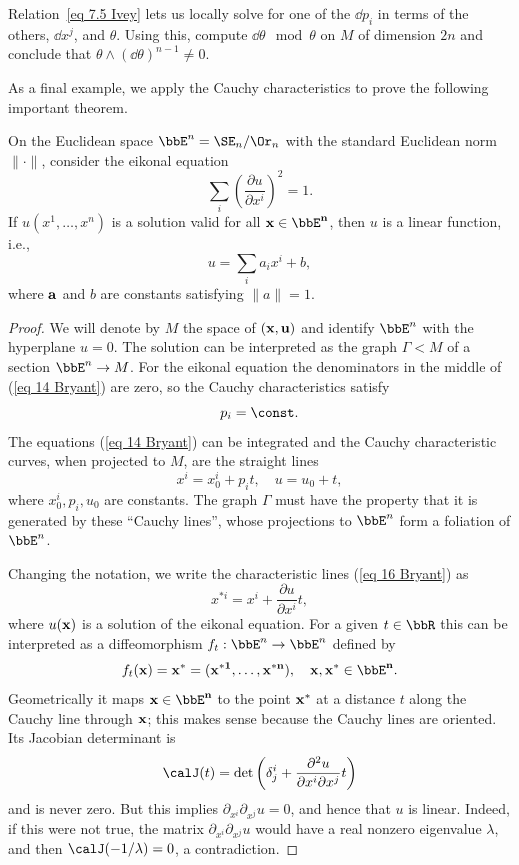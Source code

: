 \begin{xca}
    Relation~\ref{eq 7.5 Ivey} lets us locally solve for one of the $\dd p_i$ in terms of the others, $\dd x^j$, and $\theta$. Using this, compute $\dd\theta\mod \theta$ on $M$ of dimension $2n$ and conclude that $\theta\wedge(\dd\theta)^{n-1}\neq 0$.
\end{xca}


As a final example, we apply the Cauchy characteristics to prove the following important theorem.

\begin{thm}
    On the Euclidean space $\bbE^n=\SE_n\slash \Or_n$ with the standard Euclidean norm $\lVert\cdot\rVert$, consider the eikonal equation 
    \[\sum_i \left(\frac{\partial u}{\partial x^i}\right)^2=1.\]
    If $u(x^1,\ldots,x^n)$ is a solution valid for all $\bf{x}\in \bbE^n$, then $u$ is a linear function, i.e.,
    \[u=\sum_i a_i x^i+b,\]
    where $\bf{a}$ and $b$ are constants satisfying $\lVert a\rVert=1$.
\end{thm}
\begin{proof}
    We will denote by $M$ the space of $(\bf{x},u)$ and identify $\bbE^n$ with the hyperplane $u=0$. The solution can be interpreted as the graph $\Gamma < M$ of a section $\bbE^n\to M$. For the eikonal equation the denominators in the middle of (\ref{eq 14 Bryant}) are zero, so the Cauchy characteristics satisfy 
    \[p_i=\const.\]
    The equations (\ref{eq 14 Bryant}) can be integrated and the Cauchy characteristic curves, when projected to $M$, are the straight lines 
    \[x^i=x^i_0+p_i t,\quad u=u_0+t,\label{eq 16 Bryant}\]
    where $x_0^i,p_i,u_0$ are constants. The graph $\Gamma$ must have the property that it is generated by these ``Cauchy lines'', whose projections to $\bbE^n$ form a foliation of $\bbE^n$.

    Changing the notation, we write the characteristic lines (\ref{eq 16 Bryant}) as 
    \[x^{\ast i}=x^i+\frac{\partial u}{\partial x^i}t,\]
    where $u(\bf{x})$ is a solution of the eikonal equation. For a given $t\in\bbR$  this can be interpreted as a diffeomorphism $f_t:\bbE^n\to \bbE^n$ defined by 
    \[f_t(\bf{x})=\bf{x}^\ast=(x^{\ast 1},\ldots,x^{\ast n}),\quad \bf{x},\bf{x}^\ast\in\bbE^n.\]
    Geometrically it maps $\bf{x}\in\bbE^n$ to the point $\bf{x}^\ast$ at a distance $t$ along the Cauchy line through $\bf{x}$; this makes sense because the Cauchy lines are oriented. Its Jacobian determinant is 
    \[\calJ(t)=\det\left(\delta^i_j+\frac{\partial^2 u}{\partial x^i\partial x^j}t\right)\]
    and is never zero. But this implies $\partial_{x^i}\partial_{x^j}u=0$, and hence that $u$ is linear. Indeed, if this were not true, the matrix $\partial_{x^i}\partial_{x^j}u$ would have a real nonzero eigenvalue $\lambda$, and then $\calJ(-1/\lambda)=0$, a contradiction.
\end{proof}

